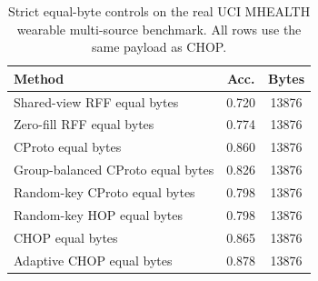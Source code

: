 \begin{table}[t]
\centering
\caption{Strict equal-byte controls on the real UCI MHEALTH wearable multi-source benchmark. All rows use the same payload as CHOP.}
\label{tab:strict-equal-byte-mhealth}
\begin{tabular}{lcc}
\toprule
Method & Acc. & Bytes \\
\midrule
Shared-view RFF equal bytes & 0.720 & 13876 \\
Zero-fill RFF equal bytes & 0.774 & 13876 \\
CProto equal bytes & 0.860 & 13876 \\
Group-balanced CProto equal bytes & 0.826 & 13876 \\
Random-key CProto equal bytes & 0.798 & 13876 \\
Random-key HOP equal bytes & 0.798 & 13876 \\
CHOP equal bytes & 0.865 & 13876 \\
Adaptive CHOP equal bytes & 0.878 & 13876 \\
\bottomrule
\end{tabular}
\end{table}
